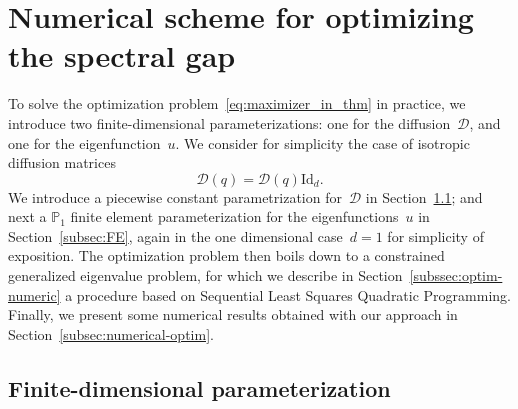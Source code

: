 \documentclass{article}
\newcommand{\Id}{\mathrm{Id}}
\newcommand{\Diff}{\mathcal{D}}
\newcommand{\Df}{\mathscr{D}}
\renewcommand{\dim}{d}
\begin{document}
\section{Numerical scheme for optimizing the spectral gap}
\label{sec:numerical}

To solve the optimization problem~\eqref{eq:maximizer_in_thm} in practice, we introduce two finite-dimensional parameterizations: one for the diffusion~$\Diff$, and one for the eigenfunction~$u$. We consider for simplicity the case of isotropic diffusion matrices
\begin{equation}
  \label{eq:scalar_diffusion_for_numerics}
  \Diff(q) = \Df(q) \Id_\dim.
\end{equation}
We introduce a piecewise constant parametrization for~$\Df$ in Section~\ref{subsec:paramD}; and next a $\mathbb{P}_1$ finite element parameterization for the eigenfunctions~$u$ in Section~\ref{subsec:FE}, again in the one dimensional case~$\dim=1$ for simplicity of exposition. The optimization problem then boils down to a constrained generalized eigenvalue problem, for which we describe in Section~\ref{subssec:optim-numeric} a procedure based on Sequential Least Squares Quadratic Programming. Finally, we present some numerical results obtained with our approach in Section~\ref{subsec:numerical-optim}.

\subsection{Finite-dimensional parameterization}
\label{subsec:paramD}
\end{document}
